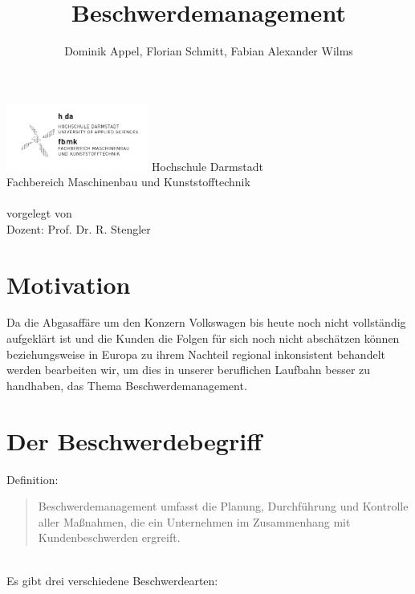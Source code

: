 \documentclass[a4paper,12pt]{article}
\title{Beschwerdemanagement}
\author{Dominik Appel, Florian Schmitt, Fabian Alexander Wilms}
\begin{document}
	\pagestyle{empty}
	\begin{center}
		\includegraphics[width=0.35\textwidth]{fig/Logo/h-da-fbmk-logo-sw.pdf}
		\vfill
		\Large Hochschule Darmstadt \\
		\vspace{12pt}
		Fachbereich Maschinenbau und Kunststofftechnik \normalsize \\
		\vfill
		\makeatletter
		\@title \\
		\vfill
		vorgelegt von \\
		\vspace{12pt}
		\@author
		\makeatother
		\vfill
		Dozent: Prof. Dr. R. Stengler\\
	\end{center}
	\newpage
	\pagestyle{plain}
	\tableofcontents
	\newpage
	\section*{Motivation}
	Da die Abgasaffäre um den Konzern Volkswagen bis heute noch nicht vollständig aufgeklärt ist und die Kunden die Folgen für sich noch nicht abschätzen können beziehungsweise in Europa zu ihrem Nachteil regional inkonsistent behandelt werden bearbeiten wir, um dies in unserer beruflichen Laufbahn besser zu handhaben, das Thema Beschwerdemanagement.
	\section{Der Beschwerdebegriff}
	\begin{center}
		Definition:
	\end{center}
	\blockquote{Beschwerdemanagement umfasst die Planung, Durchführung und Kontrolle aller Maßnahmen, die ein Unternehmen im Zusammenhang mit Kundenbeschwerden ergreift.} {\cite{Gabler}} \\
	
	Es gibt drei verschiedene Beschwerdearten:
	
\end{document}
